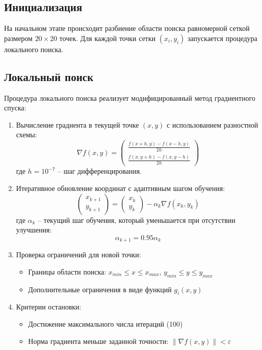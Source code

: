 \documentclass[12pt]{article}
\begin{document}
\subsection{Инициализация}
На начальном этапе происходит разбиение области поиска равномерной сеткой размером $20 \times 20$ точек. Для каждой точки сетки $(x_i, y_i)$ запускается процедура локального поиска.

\subsection{Локальный поиск}
Процедура локального поиска реализует модифицированный метод градиентного спуска:

\begin{enumerate}
    \item Вычисление градиента в текущей точке $(x, y)$ с использованием разностной схемы:
    \[
        \nabla f(x, y) = \begin{pmatrix}
            \frac{f(x + h, y) - f(x - h, y)}{2h} \\
            \frac{f(x, y + h) - f(x, y - h)}{2h}
        \end{pmatrix}
    \]
    где $h = 10^{-7}$ -- шаг дифференцирования.

    \item Итеративное обновление координат с адаптивным шагом обучения:
    \[
        \begin{pmatrix} x_{k+1} \\ y_{k+1} \end{pmatrix} = 
        \begin{pmatrix} x_k \\ y_k \end{pmatrix} - 
        \alpha_k \nabla f(x_k, y_k)
    \]
    где $\alpha_k$ -- текущий шаг обучения, который уменьшается при отсутствии улучшения:
    \[
        \alpha_{k+1} = 0.95 \alpha_k
    \]

    \item Проверка ограничений для новой точки:
    \begin{itemize}
        \item Границы области поиска: $x_{min} \leq x \leq x_{max}$, $y_{min} \leq y \leq y_{max}$
        \item Дополнительные ограничения в виде функций $g_i(x, y)$
    \end{itemize}

    \item Критерии остановки:
    \begin{itemize}
        \item Достижение максимального числа итераций (100)
        \item Норма градиента меньше заданной точности: $\|\nabla f(x, y)\| < \varepsilon$
    \end{itemize}
\end{enumerate}
\end{document}
